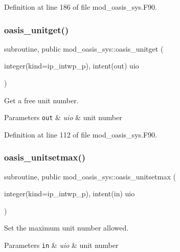 Definition at line 186 of file mod\+\_\+oasis\+\_\+sys.\+F90.

\mbox{\label{namespacemod__oasis__sys_abce4c06d8a999919a2a185c71ab15edd}} 
\subsubsection{\texorpdfstring{oasis\+\_\+unitget()}{oasis\_unitget()}}
{\footnotesize\ttfamily subroutine, public mod\+\_\+oasis\+\_\+sys\+::oasis\+\_\+unitget (\begin{DoxyParamCaption}\item[{integer(kind=ip\+\_\+intwp\+\_\+p), intent(out)}]{uio }\end{DoxyParamCaption})}



Get a free unit number. 


\begin{DoxyParams}[1]{Parameters}
\mbox{\tt out}  & {\em uio} & unit number \\
\hline
\end{DoxyParams}


Definition at line 112 of file mod\+\_\+oasis\+\_\+sys.\+F90.

\mbox{\label{namespacemod__oasis__sys_a6e0a46b41f1b9f0a1dc99b17665f49dc}} 
\subsubsection{\texorpdfstring{oasis\+\_\+unitsetmax()}{oasis\_unitsetmax()}}
{\footnotesize\ttfamily subroutine, public mod\+\_\+oasis\+\_\+sys\+::oasis\+\_\+unitsetmax (\begin{DoxyParamCaption}\item[{integer(kind=ip\+\_\+intwp\+\_\+p), intent(in)}]{uio }\end{DoxyParamCaption})}



Set the maximum unit number allowed. 


\begin{DoxyParams}[1]{Parameters}
\mbox{\tt in}  & {\em uio} & unit number \\
\hline
\end{DoxyParams}


